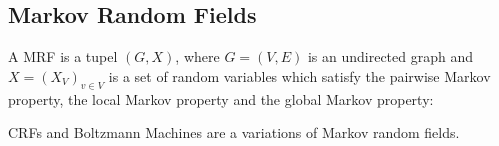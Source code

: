 
\subsection{Markov Random Fields}\label{subsec:markov-random-fields}
A \Gls{MRF} is a tupel $(G, X)$, where $G=(V,E)$ is an undirected graph and
$X=(X_V)_{v \in V}$ is a set of random variables which satisfy the pairwise
Markov property, the local Markov property and the global Markov property:



\Glspl{CRF} and Boltzmann Machines are a variations of Markov random fields.

%






